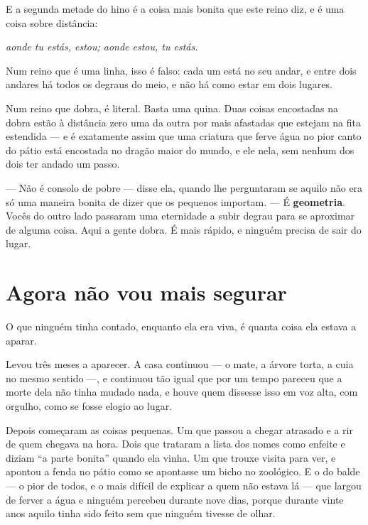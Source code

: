 \documentclass[livro.tex]{subfiles}
\begin{document}
\medskip

E a segunda metade do hino é a coisa mais bonita que este reino diz, e é uma coisa sobre
distância:

\emph{aonde tu estás, estou; aonde estou, tu estás.}

Num reino que é uma linha, isso é falso: cada um está no seu andar, e entre dois andares há todos
os degraus do meio, e não há como estar em dois lugares.

Num reino que dobra, é literal. Basta uma quina. Duas coisas encostadas na dobra estão à
distância zero uma da outra por mais afastadas que estejam na fita estendida --- e é exatamente
assim que uma criatura que ferve água no pior canto do pátio está encostada no dragão maior do
mundo, e ele nela, sem nenhum dos dois ter andado um passo.

\medskip

--- Não é consolo de pobre --- disse ela, quando lhe perguntaram se aquilo não era só uma maneira
bonita de dizer que os pequenos importam. --- É \textbf{geometria}. Vocês do outro lado passaram
uma eternidade a subir degrau para se aproximar de alguma coisa. Aqui a gente dobra. É mais
rápido, e ninguém precisa de sair do lugar.

\chapter{Agora não vou mais segurar}

O que ninguém tinha contado, enquanto ela era viva, é quanta coisa ela estava a aparar.

Levou três meses a aparecer. A casa continuou --- o mate, a árvore torta, a cuia no mesmo
sentido ---, e continuou tão igual que por um tempo pareceu que a morte dela não tinha mudado
nada, e houve quem dissesse isso em voz alta, com orgulho, como se fosse elogio ao lugar.

Depois começaram as coisas pequenas. Um que passou a chegar atrasado e a rir de quem chegava na
hora. Dois que trataram a lista dos nomes como enfeite e diziam ``a parte bonita'' quando ela
vinha. Um que trouxe visita para ver, e apontou a fenda no pátio como se apontasse um bicho no
zoológico. E o do balde --- o pior de todos, e o mais difícil de explicar a quem não estava lá ---
que largou de ferver a água e ninguém percebeu durante nove dias, porque durante vinte anos
aquilo tinha sido feito sem que ninguém tivesse de olhar.
\end{document}
